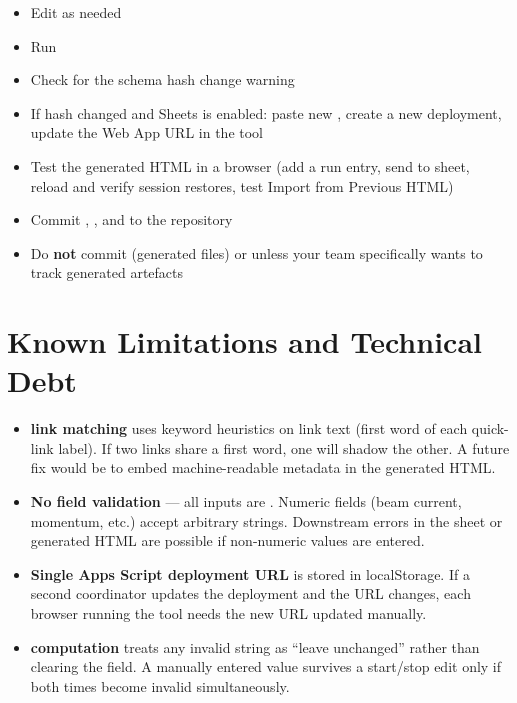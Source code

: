 \begin{itemize}
    \item[$\square$] Edit  as needed
    \item[$\square$] Run 
    \item[$\square$] Check for the schema hash change warning
    \item[$\square$] If hash changed and Sheets is enabled: paste new
          , create a new deployment, update the Web
          App URL in the tool
    \item[$\square$] Test the generated HTML in a browser (add a run entry,
          send to sheet, reload and verify session restores, test Import from
          Previous HTML)
    \item[$\square$] Commit , , and
           to the repository
    \item[$\square$] Do \textbf{not} commit  (generated files)
          or  unless your team specifically wants to track
          generated artefacts
\end{itemize}

\chapter{Known Limitations and Technical Debt}
\label{ch:limitations}

\begin{itemize}
    \item \textbf{ link matching} uses keyword heuristics
          on link text (first word of each quick-link label). If two links
          share a first word, one will shadow the other. A future fix would
          be to embed machine-readable metadata in the generated HTML.

    \item \textbf{No field validation} --- all inputs are .
          Numeric fields (beam current, momentum, etc.) accept arbitrary
          strings. Downstream errors in the sheet or generated HTML are
          possible if non-numeric values are entered.

    \item \textbf{Single Apps Script deployment URL} is stored in
          localStorage. If a second coordinator updates the deployment and
          the URL changes, each browser running the tool needs the new URL
          updated manually.

    \item \textbf{ computation} treats any invalid
           string as ``leave unchanged'' rather than clearing the
          field. A manually entered value survives a start/stop edit only if
          both times become invalid simultaneously.
\end{itemize}


